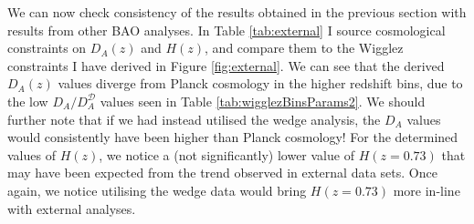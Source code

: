 \documentclass[titlesmallcaps, examinerscopy, copyrightpage]{uqthesis}
\begin{document}
We can now check consistency of the results obtained in the previous section with results from other BAO analyses. In Table \ref{tab:external} I source cosmological constraints on $D_A(z)$ and $H(z)$, and compare them to the Wigglez constraints I have derived in Figure \ref{fig:external}. We can see that the derived $D_A(z)$ values diverge from Planck cosmology in the higher redshift bins, due to the low $D_A/D^{\mathcal{D}}_A$ values seen in Table \ref{tab:wigglezBinsParams2}. We should further note that if we had instead utilised the wedge analysis, the $D_A$ values would consistently have been higher than Planck cosmology! For the determined values of $H(z)$, we notice a (not significantly) lower value of $H(z = 0.73)$ that may have been expected from the trend observed in external data sets. Once again, we notice utilising the wedge data would bring $H(z=0.73)$ more in-line with external analyses.\\




\begin{table}[h]
\centering
\caption{External constraints on $D_A(z)$ and $H(z)$.}
\end{table}
\end{document}
